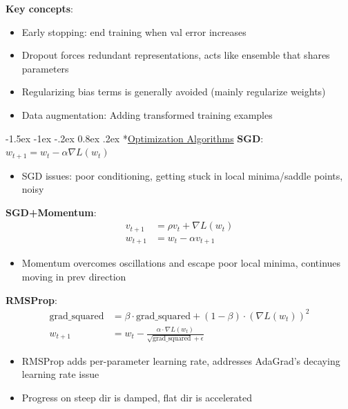 \documentclass{article}
\makeatletter
\renewcommand\section{\@startsection{section}{1}{\z@}%
                                  {-1.5ex \@plus -1ex \@minus -.2ex}%
                                  {0.8ex \@plus.2ex}%
                                  {\normalfont\small\bfseries}}
\makeatother
\begin{document}
\begin{multicols}{3}
\textbf{Key concepts}:
\begin{itemize}
\item Early stopping: end training when val error increases
\item Dropout forces redundant representations, acts like ensemble that shares parameters
\item Regularizing bias terms is generally avoided (mainly regularize weights)
\item Data augmentation: Adding transformed training examples
\end{itemize}

\section*{\underline{Optimization Algorithms}}
\textbf{SGD}: $w_{t+1} = w_t - \alpha \nabla L(w_t)$
\begin{itemize}
    \item SGD issues: poor conditioning, getting stuck in local minima/saddle points, noisy
\end{itemize}

\textbf{SGD+Momentum}: 
\begin{align*}
v_{t+1} &= \rho v_t + \nabla L(w_t) \tag{typically $\rho = 0.9$ or $0.99$}\\
w_{t+1} &= w_t - \alpha v_{t+1}
\end{align*}
\begin{itemize}
    \item Momentum overcomes oscillations and escape poor local minima, continues moving in prev direction
\end{itemize}

\textbf{RMSProp}:
\begin{align*}
\text{grad\_squared} &= \beta \cdot \text{grad\_squared} + (1-\beta) \cdot (\nabla L(w_t))^2\\
w_{t+1} &= w_t - \frac{\alpha \cdot \nabla L(w_t)}{\sqrt{\text{grad\_squared}} + \epsilon}
\end{align*}
\begin{itemize}
    \item RMSProp adds per-parameter learning rate, addresses AdaGrad's decaying learning rate issue
    \item Progress on steep dir is damped, flat dir is accelerated
\end{itemize}


\end{multicols}
\end{document}
